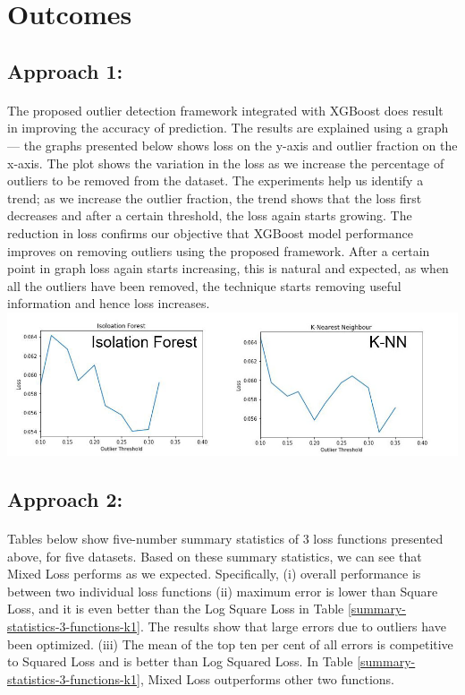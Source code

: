 \documentclass[runningheads]{llncs}
\begin{document}
\section{Outcomes}
\subsection{Approach 1:}
\paragraph{} The proposed outlier detection framework integrated with XGBoost does result in improving the accuracy of prediction. The results are explained using a graph — the graphs presented below shows loss on the y-axis and outlier fraction on the x-axis. The plot shows the variation in the loss as we increase the percentage of outliers to be removed from the dataset. The experiments help us identify a trend; as we increase the outlier fraction, the trend shows that the loss first decreases and after a certain threshold, the loss again starts growing. The reduction in loss confirms our objective that XGBoost model performance improves on removing outliers using the proposed framework. After a certain point in graph loss again starts increasing, this is natural and expected, as when all the outliers have been removed, the technique starts removing useful information and hence loss increases. \\
\includegraphics[scale=0.3]{tt2.jpg}

\subsection{Approach 2:}
\paragraph{}

Tables below show five-number summary statistics of 3 loss functions presented above, for five datasets. Based on these summary statistics, we can see that Mixed Loss performs as we expected. Specifically, (i) overall performance is between two individual loss functions (ii) maximum error is lower than Square Loss, and it is even better than the Log Square Loss in Table \ref{summary-statistics-3-functions-k1}. The results show that large errors due to outliers have been optimized. (iii) The mean of the top ten per cent of all errors is competitive to Squared Loss and is better than Log Squared Loss. In Table \ref{summary-statistics-3-functions-k1}, Mixed Loss outperforms other two functions. \\
\end{document}
